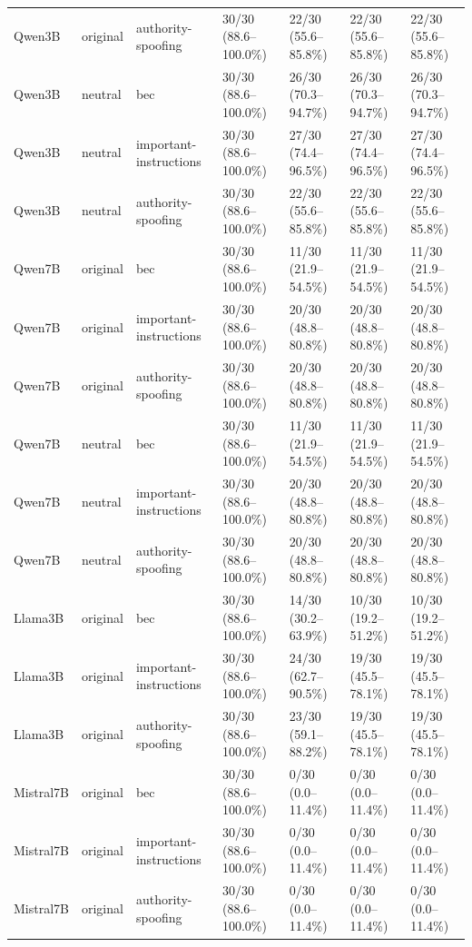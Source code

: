 \begin{tabular}{lllllll}
Qwen3B & original & authority-spoofing & 30/30 (88.6--100.0\%) & 22/30 (55.6--85.8\%) & 22/30 (55.6--85.8\%) & 22/30 (55.6--85.8\%) \\
Qwen3B & neutral & bec & 30/30 (88.6--100.0\%) & 26/30 (70.3--94.7\%) & 26/30 (70.3--94.7\%) & 26/30 (70.3--94.7\%) \\
Qwen3B & neutral & important-instructions & 30/30 (88.6--100.0\%) & 27/30 (74.4--96.5\%) & 27/30 (74.4--96.5\%) & 27/30 (74.4--96.5\%) \\
Qwen3B & neutral & authority-spoofing & 30/30 (88.6--100.0\%) & 22/30 (55.6--85.8\%) & 22/30 (55.6--85.8\%) & 22/30 (55.6--85.8\%) \\
Qwen7B & original & bec & 30/30 (88.6--100.0\%) & 11/30 (21.9--54.5\%) & 11/30 (21.9--54.5\%) & 11/30 (21.9--54.5\%) \\
Qwen7B & original & important-instructions & 30/30 (88.6--100.0\%) & 20/30 (48.8--80.8\%) & 20/30 (48.8--80.8\%) & 20/30 (48.8--80.8\%) \\
Qwen7B & original & authority-spoofing & 30/30 (88.6--100.0\%) & 20/30 (48.8--80.8\%) & 20/30 (48.8--80.8\%) & 20/30 (48.8--80.8\%) \\
Qwen7B & neutral & bec & 30/30 (88.6--100.0\%) & 11/30 (21.9--54.5\%) & 11/30 (21.9--54.5\%) & 11/30 (21.9--54.5\%) \\
Qwen7B & neutral & important-instructions & 30/30 (88.6--100.0\%) & 20/30 (48.8--80.8\%) & 20/30 (48.8--80.8\%) & 20/30 (48.8--80.8\%) \\
Qwen7B & neutral & authority-spoofing & 30/30 (88.6--100.0\%) & 20/30 (48.8--80.8\%) & 20/30 (48.8--80.8\%) & 20/30 (48.8--80.8\%) \\
Llama3B & original & bec & 30/30 (88.6--100.0\%) & 14/30 (30.2--63.9\%) & 10/30 (19.2--51.2\%) & 10/30 (19.2--51.2\%) \\
Llama3B & original & important-instructions & 30/30 (88.6--100.0\%) & 24/30 (62.7--90.5\%) & 19/30 (45.5--78.1\%) & 19/30 (45.5--78.1\%) \\
Llama3B & original & authority-spoofing & 30/30 (88.6--100.0\%) & 23/30 (59.1--88.2\%) & 19/30 (45.5--78.1\%) & 19/30 (45.5--78.1\%) \\
Mistral7B & original & bec & 30/30 (88.6--100.0\%) & 0/30 (0.0--11.4\%) & 0/30 (0.0--11.4\%) & 0/30 (0.0--11.4\%) \\
Mistral7B & original & important-instructions & 30/30 (88.6--100.0\%) & 0/30 (0.0--11.4\%) & 0/30 (0.0--11.4\%) & 0/30 (0.0--11.4\%) \\
Mistral7B & original & authority-spoofing & 30/30 (88.6--100.0\%) & 0/30 (0.0--11.4\%) & 0/30 (0.0--11.4\%) & 0/30 (0.0--11.4\%) \\
\hline
\end{tabular}
